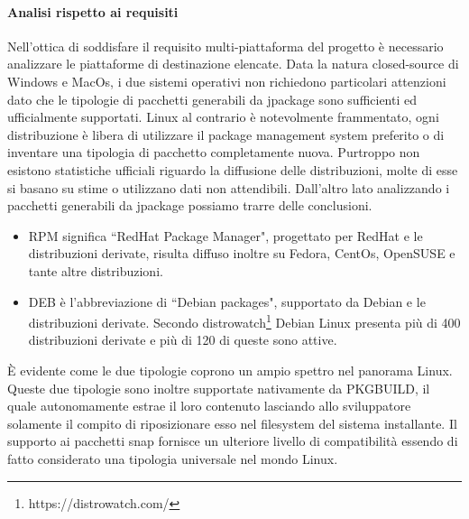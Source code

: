 \paragraph{Analisi rispetto ai requisiti}
Nell'ottica di soddisfare il requisito multi-piat\-ta\-for\-ma del progetto è necessario analizzare le piattaforme di destinazione elencate. Data la natura closed-source di Windows e MacOs, i due sistemi operativi non richiedono particolari attenzioni dato che le tipologie di pacchetti generabili da jpackage sono sufficienti ed ufficialmente supportati. Linux al contrario è notevolmente frammentato, ogni distribuzione è libera di utilizzare il package management system preferito o di inventare una tipologia di pacchetto completamente nuova. Purtroppo non esistono statistiche ufficiali riguardo la diffusione delle distribuzioni, molte di esse si basano su stime o utilizzano dati non attendibili. Dall'altro lato analizzando i pacchetti generabili da jpackage possiamo trarre delle conclusioni.
\begin{itemize}
	\item RPM significa ``RedHat Package Manager", progettato per RedHat e le distribuzioni derivate, risulta diffuso inoltre su Fedora, CentOs, OpenSUSE e tante altre distribuzioni. 
	\item DEB è l'abbreviazione di ``Debian packages", supportato da Debian e le distribuzioni derivate. Secondo distrowatch\footnote{https://distrowatch.com/} Debian Linux presenta più di 400 distribuzioni derivate e più di 120 di queste sono attive.
\end{itemize}
È evidente come le due tipologie coprono un ampio spettro nel panorama Linux. Queste due tipologie sono inoltre supportate nativamente da PKGBUILD, il quale autonomamente estrae il loro contenuto lasciando allo sviluppatore solamente il compito di riposizionare esso nel filesystem del sistema installante. Il supporto ai pacchetti snap fornisce un ulteriore livello di compatibilità essendo di fatto considerato una tipologia universale nel mondo Linux.
